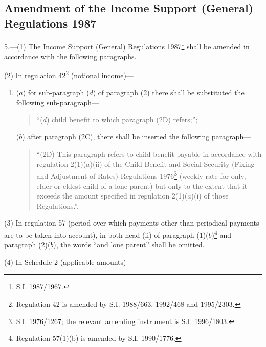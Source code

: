 \documentclass[a4paper]{article}
\newcommand\fnote[1]{\footnote{\frenchspacing #1}}
\begin{document}
\subsection[5. Amendment of the Income Support (General) Regulations 1987]{Amendment of the Income Support (General) Regulations 1987}

5.---(1) The Income Support (General) Regulations 1987\fnote{S.I. 1987/1967.} shall be amended in accordance with the following paragraphs.

(2)  In regulation 42\footnote{\frenchspacing Regulation 42 is amended by S.I. 1988/663, 1992/468 and 1995/2303.} (notional income)—
\begin{enumerate}\item[]
($a$) for sub-paragraph ($d$) of paragraph (2) there shall be substituted the following sub-paragraph—
\begin{quotation}
“($d$) child benefit to which paragraph (2D) refers;”;
\end{quotation}

($b$) after paragraph (2C), there shall be inserted the following paragraph—
\begin{quotation}
“(2D) This paragraph refers to child benefit payable in accordance with regulation 2(1)($a$)(ii) of the Child Benefit and Social Security (Fixing and Adjustment of Rates) Regulations 1976\footnote{\frenchspacing S.I. 1976/1267; the relevant amending instrument is S.I. 1996/1803.} (weekly rate for only, elder or eldest child of a lone parent) but only to the extent that it exceeds the amount specified in regulation 2(1)($a$)(i) of those Regulations.”.
\end{quotation}
\end{enumerate}

(3)  In regulation 57 (period over which payments other than periodical payments are to be taken into account), in both head (ii) of paragraph (1)($b$)\footnote{\frenchspacing Regulation 57(1)(b) is amended by S.I. 1990/1776.} and paragraph (2)($b$), the words “and lone parent” shall be omitted.

(4) In Schedule 2 (applicable amounts)---
\end{document}
